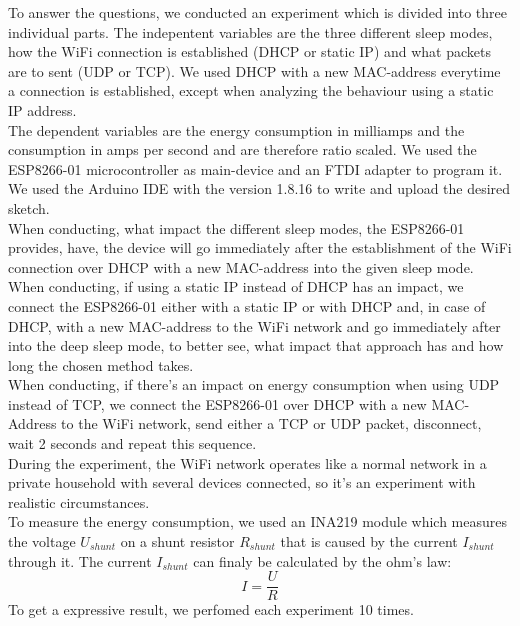 To answer the questions, we conducted an experiment which is divided into three individual parts.
The indepentent variables are the three different sleep modes, how the WiFi connection is established (DHCP or static IP) and what packets are to sent (UDP or TCP).
We used DHCP with a new MAC-address everytime a connection is established, except when analyzing the behaviour using a static IP address.\\
The dependent variables are the energy consumption in milliamps and the consumption in amps per second and are therefore ratio scaled.
We used the ESP8266-01 microcontroller as main-device and an FTDI adapter to program it. We used the Arduino IDE with the version 1.8.16 to write and upload the desired sketch.\\
When conducting, what impact the different sleep modes, the ESP8266-01 provides, have, the device will go immediately after the establishment of the WiFi connection over DHCP with a new MAC-address into the given sleep mode.\\
When conducting, if using a static IP instead of DHCP has an impact, we connect the ESP8266-01 either with a static IP or with DHCP and, in case of DHCP, with a new MAC-address to the WiFi network and go immediately after into the deep sleep mode, to better see, what impact that approach has and how long the chosen method takes.\\
When conducting, if there's an impact on energy consumption when using UDP instead of TCP, we connect the ESP8266-01 over DHCP with a new MAC-Address to the WiFi network, send either a TCP or UDP packet, disconnect, wait 2 seconds and repeat this sequence.\\
During the experiment, the WiFi network operates like a normal network in a private household with several devices connected, so it's an experiment with realistic circumstances.\\

To measure the energy consumption, we used an INA219 module which measures the voltage $U_{shunt}$ on a shunt resistor $R_{shunt}$ that is caused by the current $I_{shunt}$ through it.
The current $I_{shunt}$ can finaly be calculated by the ohm's law:
\begin{equation*}
    I = \frac{U}{R}
\end{equation*}
To get a expressive result, we perfomed each experiment 10 times.





